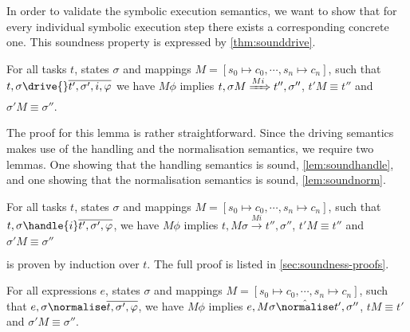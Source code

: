 %

In order to validate the symbolic execution semantics,
we want to show that for every individual symbolic execution step there exists a corresponding concrete one.
This soundness property is expressed by \cref{thm:sounddrive}.

\begin{theorem}
  \label{thm:sounddrive}

  For all tasks $t$, states $\sigma$ and mappings $M=[s_0\mapsto c_0,\cdots,s_n\mapsto c_n]$,
  such that $t,\sigma\drive{} \overline{t',\sigma',i,\phi}$
  we have $M\phi$ implies
  $t,\sigma M \xRightarrow[]{M i} t'',\sigma''$, $t'M \equiv t''$ and $\sigma' M \equiv \sigma''$.
\end{theorem}

The proof for this lemma is rather straightforward.
Since the driving semantics makes use of the handling and the normalisation semantics, we require two lemmas.
One showing that the handling semantics is sound, \cref{lem:soundhandle}, and one showing that the normalisation semantics is sound, \cref{lem:soundnorm}.

\begin{lemma}
  \label{lem:soundhandle}

  For all tasks $t$, states $\sigma$ and mappings $M = [s_0\mapsto c_0,\cdots,s_n\mapsto c_n]$,
  such that $t,\sigma\handle{i} \overline{t',\sigma',\phi}$,
  we have $M\phi$ implies
  $t,M \sigma \xrightarrow[]{M i} t'',\sigma''$, $t'M \equiv t'' $ and $\sigma' M \equiv \sigma''$
\end{lemma}

 is proven by induction over $t$.
The full proof is listed in \cref{sec:soundness-proofs}.

\begin{lemma}
  \label{lem:soundnorm}

  For all expressions $e$, states $\sigma$ and mappings $M=[s_0\mapsto c_0,\cdots,s_n\mapsto c_n]$,
  such that $e,\sigma\normalise \overline{t,\sigma',\phi}$,
  we have $M\phi$ implies
  $e,M \sigma \hat{\normalise}t',\sigma''$, $t M \equiv t'$ and $\sigma' M \equiv \sigma''$.

\end{lemma}


